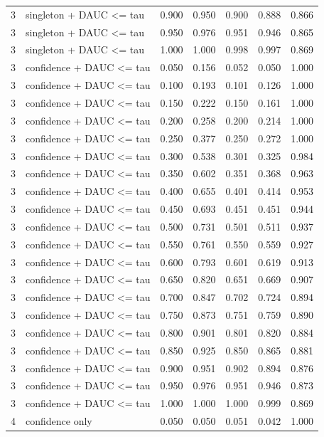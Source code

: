\begin{tabular}{rlrrrrr}
3 & singleton + DAUC <= tau & 0.900 & 0.950 & 0.900 & 0.888 & 0.866 \\
3 & singleton + DAUC <= tau & 0.950 & 0.976 & 0.951 & 0.946 & 0.865 \\
3 & singleton + DAUC <= tau & 1.000 & 1.000 & 0.998 & 0.997 & 0.869 \\
3 & confidence + DAUC <= tau & 0.050 & 0.156 & 0.052 & 0.050 & 1.000 \\
3 & confidence + DAUC <= tau & 0.100 & 0.193 & 0.101 & 0.126 & 1.000 \\
3 & confidence + DAUC <= tau & 0.150 & 0.222 & 0.150 & 0.161 & 1.000 \\
3 & confidence + DAUC <= tau & 0.200 & 0.258 & 0.200 & 0.214 & 1.000 \\
3 & confidence + DAUC <= tau & 0.250 & 0.377 & 0.250 & 0.272 & 1.000 \\
3 & confidence + DAUC <= tau & 0.300 & 0.538 & 0.301 & 0.325 & 0.984 \\
3 & confidence + DAUC <= tau & 0.350 & 0.602 & 0.351 & 0.368 & 0.963 \\
3 & confidence + DAUC <= tau & 0.400 & 0.655 & 0.401 & 0.414 & 0.953 \\
3 & confidence + DAUC <= tau & 0.450 & 0.693 & 0.451 & 0.451 & 0.944 \\
3 & confidence + DAUC <= tau & 0.500 & 0.731 & 0.501 & 0.511 & 0.937 \\
3 & confidence + DAUC <= tau & 0.550 & 0.761 & 0.550 & 0.559 & 0.927 \\
3 & confidence + DAUC <= tau & 0.600 & 0.793 & 0.601 & 0.619 & 0.913 \\
3 & confidence + DAUC <= tau & 0.650 & 0.820 & 0.651 & 0.669 & 0.907 \\
3 & confidence + DAUC <= tau & 0.700 & 0.847 & 0.702 & 0.724 & 0.894 \\
3 & confidence + DAUC <= tau & 0.750 & 0.873 & 0.751 & 0.759 & 0.890 \\
3 & confidence + DAUC <= tau & 0.800 & 0.901 & 0.801 & 0.820 & 0.884 \\
3 & confidence + DAUC <= tau & 0.850 & 0.925 & 0.850 & 0.865 & 0.881 \\
3 & confidence + DAUC <= tau & 0.900 & 0.951 & 0.902 & 0.894 & 0.876 \\
3 & confidence + DAUC <= tau & 0.950 & 0.976 & 0.951 & 0.946 & 0.873 \\
3 & confidence + DAUC <= tau & 1.000 & 1.000 & 1.000 & 0.999 & 0.869 \\
4 & confidence only & 0.050 & 0.050 & 0.051 & 0.042 & 1.000 \\

\end{tabular}
